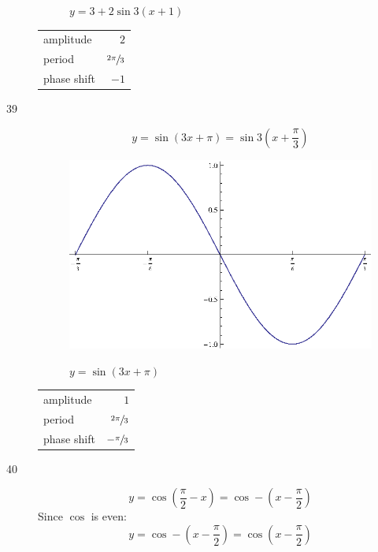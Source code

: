 \documentclass{exam}
\begin{document}
\begin{description}
\begin{figure}[H]
          $y = 3 + 2 \sin 3 \left( x + 1 \right)$
        \end{figure}

        \begin{tabular}[H]{lr}
          \toprule
          amplitude   & $2$ \\
          period      & $\sfrac{2 \pi}{3}$ \\
          phase shift & $-1$ \\
          \bottomrule
        \end{tabular}

      \pagebreak

      \item[39]
        \[
          y = \sin \left( 3x + \pi \right) = \sin 3 \left( x + \frac{\pi}{3} \right) 
        \]

        \begin{figure}[H]
          \centering
          \includegraphics[scale=1.0]{exercise39.eps}

          $y = \sin \left( 3x + \pi \right)$
        \end{figure}

        \begin{tabular}[H]{lr}
          \toprule
          amplitude   & $1$ \\
          period      & $\sfrac{2 \pi}{3}$ \\
          phase shift & $- \sfrac{\pi}{3}$ \\
          \bottomrule
        \end{tabular}

      \pagebreak

      \item[40]
        \[
          y = \cos \left( \frac{\pi}{2} - x \right) = \cos - \left( x - \frac{\pi}{2} \right) 
        \]
        Since $\cos$ is even:
        \[
          y = \cos - \left( x - \frac{\pi}{2} \right) = \cos \left( x - \frac{\pi}{2} \right)
        \]



\end{description}
\end{document}
